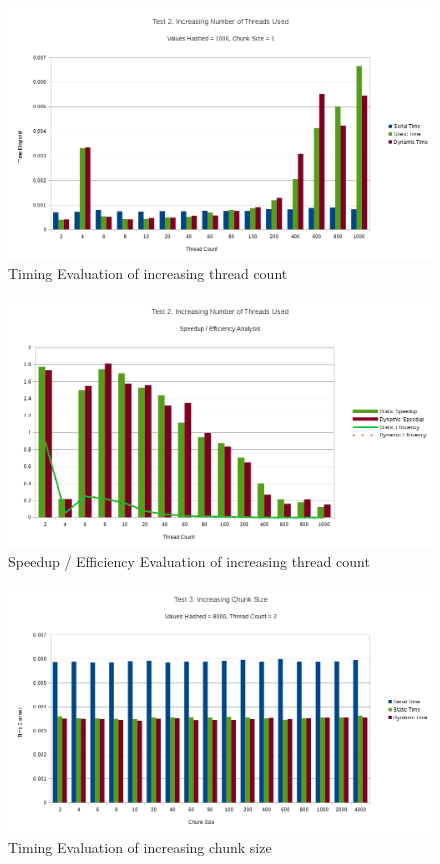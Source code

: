 \documentclass{article}
\begin{document}
\begin{figure}
  \caption{Timing Evaluation of increasing thread count}
  \centering
  \includegraphics[width=\textwidth]{chart2a}
\end{figure}

\begin{figure}
  \caption{Speedup / Efficiency Evaluation of increasing thread count}
  \centering
  \includegraphics[width=\textwidth]{chart2b}
\end{figure}

\begin{figure}
  \caption{Timing Evaluation of increasing chunk size}
  \centering
  \includegraphics[width=\textwidth]{chart3a}
\end{figure}
\end{document}
